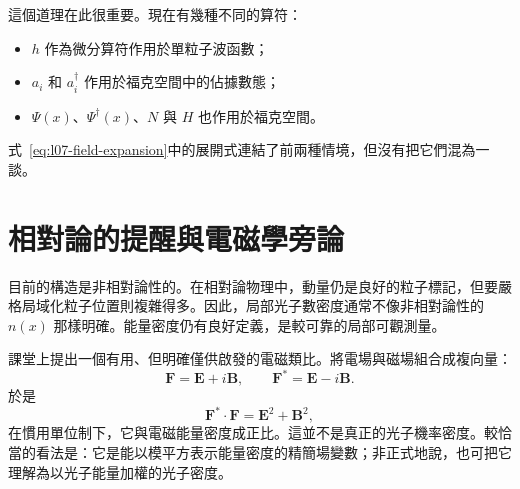 這個道理在此很重要。現在有幾種不同的算符：
\begin{itemize}
\item \(h\) 作為微分算符作用於單粒子波函數；
\item \(a_i\) 和 \(a_i^\dagger\) 作用於福克空間中的佔據數態；
\item \(\Psi(x)\)、\(\Psi^\dagger(x)\)、\(N\) 與 \(H\) 也作用於福克空間。
\end{itemize}
式~\eqref{eq:l07-field-expansion}中的展開式連結了前兩種情境，但沒有把它們混為一談。

\begin{classroomqa}
\end{classroomqa}

\section{相對論的提醒與電磁學旁論}

目前的構造是非相對論性的。在相對論物理中，動量仍是良好的粒子標記，但要嚴格局域化粒子位置則複雜得多。因此，局部光子數密度通常不像非相對論性的 \(n(x)\) 那樣明確。能量密度仍有良好定義，是較可靠的局部可觀測量。

課堂上提出一個有用、但明確僅供啟發的電磁類比。將電場與磁場組合成複向量：
\begin{equation}
\mathbf F=\mathbf E+i\mathbf B,
\qquad
\mathbf F^*=\mathbf E-i\mathbf B.
\label{eq:l07-riemann-silberstein}
\end{equation}
於是
\begin{equation}
\mathbf F^*\mathbin{\cdot}\mathbf F
=\mathbf E^2+\mathbf B^2,
\label{eq:l07-em-density}
\end{equation}
在慣用單位制下，它與電磁能量密度成正比。這並不是真正的光子機率密度。較恰當的看法是：它是能以模平方表示能量密度的精簡場變數；非正式地說，也可把它理解為以光子能量加權的光子密度。

\begin{classroomqa}
\end{classroomqa}

